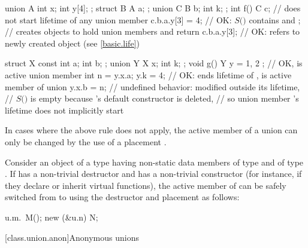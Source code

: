 \begin{example}
\begin{codeblock}
union A { int x; int y[4]; };
struct B { A a; };
union C { B b; int k; };
int f() {
  C c;                  // does not start lifetime of any union member
  c.b.a.y[3] = 4;       // OK: $S($$)$ contains  and ;
                        // creates objects to hold union members  and 
  return c.b.a.y[3];    // OK:  refers to newly created object (see \ref{basic.life})
}

struct X { const int a; int b; };
union Y { X x; int k; };
void g() {
  Y y = { { 1, 2 } };   // OK,  is active union member
  int n = y.x.a;
  y.k = 4;              // OK: ends lifetime of ,  is active member of union
  y.x.b = n;            // undefined behavior:  modified outside its lifetime,
                        // $S($$)$ is empty because 's default constructor is deleted,
                        // so union member 's lifetime does not implicitly start
}
\end{codeblock}
\end{example}

\pnum
\begin{note}
In cases where the above rule does not apply,
the active member of a union can only be changed by
the use of a placement .
\end{note}
\begin{example}
Consider an object  of a  type  having non-static data members
 of type  and  of type . If  has a non-trivial
destructor and  has a non-trivial constructor (for instance, if they declare or inherit
virtual functions), the active member of  can be safely switched from  to
 using the destructor and placement  as follows:
\begin{codeblock}
u.m.~M();
new (&u.n) N;
\end{codeblock}
\end{example}

[class.union.anon]{Anonymous unions}
%

